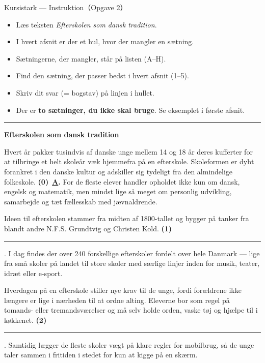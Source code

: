 \begin{emailbox}{Kursistark --- Instruktion（Opgave 2）}
\begin{itemize}
  \item Læs teksten \textit{Efterskolen som dansk tradition}.
  \item I hvert afsnit er der et hul, hvor der mangler en sætning.
  \item Sætningerne, der mangler, står på listen (A--H).
  \item Find den sætning, der passer bedst i hvert afsnit (1--5).
  \item Skriv dit svar (= bogstav) på linjen i hullet.
  \item Der er \textbf{to sætninger, du ikke skal bruge}. Se eksemplet i første afsnit.
\end{itemize}

\vspace{0.35em}
\hrule
\vspace{0.45em}

\textbf{\color{NCDNavy}Efterskolen som dansk tradition}

\vspace{0.3em}
Hvert år pakker tusindvis af danske unge mellem 14 og 18 år deres kufferter for at tilbringe et helt skoleår væk hjemmefra på en efterskole. Skoleformen er dybt forankret i den danske kultur og adskiller sig tydeligt fra den almindelige folkeskole. \textbf{(0)}\ \underline{\hspace{0.45cm}\textbf{A}\hspace{0.45cm}}\textbf{.} For de fleste elever handler opholdet ikke kun om dansk, engelsk og matematik, men mindst lige så meget om personlig udvikling, samarbejde og tæt fællesskab med jævnaldrende.

\vspace{0.25em}
Ideen til efterskolen stammer fra midten af 1800-tallet og bygger på tanker fra blandt andre N.F.S. Grundtvig og Christen Kold. \textbf{(1)}\ \rule{1.8cm}{0.4pt}. I dag findes der over 240 forskellige efterskoler fordelt over hele Danmark --- lige fra små skoler på landet til store skoler med særlige linjer inden for musik, teater, idræt eller e-sport.

\vspace{0.25em}
Hverdagen på en efterskole stiller nye krav til de unge, fordi forældrene ikke længere er lige i nærheden til at ordne alting. Eleverne bor som regel på tomands- eller tremandsværelser og må selv holde orden, vaske tøj og hjælpe til i køkkenet. \textbf{(2)}\ \rule{1.8cm}{0.4pt}. Samtidig lægger de fleste skoler vægt på klare regler for mobilbrug, så de unge taler sammen i fritiden i stedet for kun at kigge på en skærm.


\end{emailbox}
